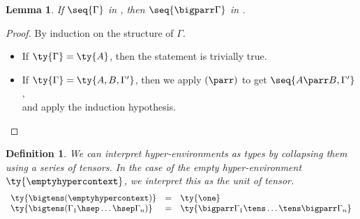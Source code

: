 \documentclass[submission,copyright,creativecommons]{eptcs}
\newtheorem{definition}{Definition}
\newtheorem{lemma}{Lemma}
\begin{document}
\begin{lemma}\label{lem:cp-bigparr}
  If $\seq{\Gamma}$ in \cp, then $\seq{\bigparr\Gamma}$ in \cp.
\end{lemma}
\begin{proof}
  By induction on the structure of $\Gamma$.
  \begin{itemize}
  \item
    If $\ty{\Gamma} = \ty{A}$, then the statement is trivially true.
  \item
    If $\ty{\Gamma} = \ty{A, B, \Gamma'}$,
    then we apply $(\parr)$ to get $\seq{A \parr B, \Gamma'}$,\\
    and apply the induction hypothesis.
  \end{itemize}
\end{proof}

\begin{definition}\label{def:bigtens}
  We can interpret hyper-environments as types by collapsing them using a series
  of tensors. In the case of the empty hyper-environment
  $\ty{\emptyhypercontext}$, we interpret this as the unit of tensor.
  \begin{gather*}
    \begin{array}{lcl}
      \ty{\bigtens(\emptyhypercontext)}
      & = & \ty{\one}
      \\
      \ty{\bigtens(\Gamma_1 \hsep \dots \hsep \Gamma_n)}
      & = & \ty{\bigparr\Gamma_1 \tens \dots \tens \bigparr\Gamma_n}
    \end{array}
  \end{gather*}
\end{definition}
\end{document}
